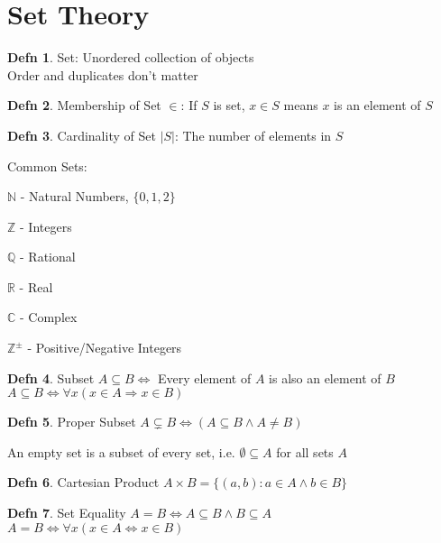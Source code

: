 \documentclass[a4paper]{article}
\theoremstyle{definition}
\newtheorem*{defn}{Defn}
\newenvironment{theorem}[1]
  {\renewcommand\theinnertheorem{#1}\innertheorem}
  {\endinnertheorem}
\begin{document}
\section{Set Theory}

\begin{defn}{Set: Unordered collection of objects}\\ Order and duplicates don't matter \end{defn}

\begin{defn}{Membership of Set $\in$: } If $S$ is set, $x \in S$ means $x$ is an element of $S$ \end{defn}

\begin{defn}{Cardinality of Set $|S|$: } The number of elements in $S$ \end{defn}

Common Sets:

$\mathbb{N}$ - Natural Numbers, $\{0, 1, 2\}$

$\mathbb{Z}$ - Integers

$\mathbb{Q}$ - Rational

$\mathbb{R}$ - Real

$\mathbb{C}$ - Complex

$\mathbb{Z}^\pm$ - Positive/Negative Integers

\begin{defn}{Subset}
  $A \subseteq B \Leftrightarrow$ Every element of $A$ is also an element of $B$\\
  $A \subseteq B \Leftrightarrow \forall x(x\in A \Rightarrow x \in B)$
\end{defn}

\begin{defn}{Proper Subset} $A \subsetneq B \Leftrightarrow (A \subseteq B \land A \not = B)$ \end{defn}

\begin{theorem}{6.2.4} An empty set is a subset of every set, i.e. $\emptyset \subseteq A$ for all sets $A$ \end{theorem}

\begin{defn}{Cartesian Product} $A \times B = \{(a, b): a \in A \land b \in B\} $ \end{defn}

\begin{defn}{Set Equality}
  $A = B \Leftrightarrow A \subseteq B \land B \subseteq A$ \\
  $A = B \Leftrightarrow \forall x (x \in A \Leftrightarrow x \in B)$
\end{defn}
\end{document}
